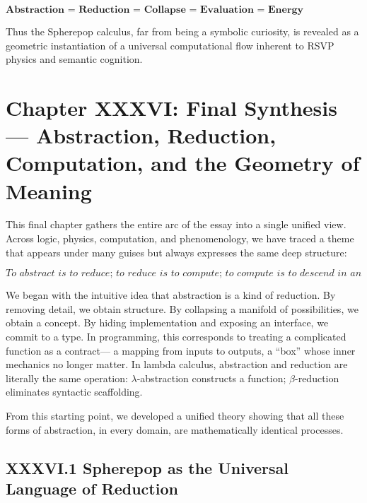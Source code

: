 \documentclass[12pt,letterpaper]{article}
\begin{document}
\[
\boxed{
\textbf{
Abstraction = Reduction = Collapse = Evaluation = 
Energy Minimization = Semantic Convergence.}}
\]

Thus the Spherepop calculus, far from being a symbolic curiosity,
is revealed as a geometric instantiation of a universal computational flow
inherent to RSVP physics and semantic cognition.

\newpage

\section{Chapter XXXVI: Final Synthesis —  
Abstraction, Reduction, Computation, and the Geometry of Meaning}

This final chapter gathers the entire arc of the essay into a single unified view.  
Across logic, physics, computation, and phenomenology, we have traced a theme that 
appears under many guises but always expresses the same deep structure:

\[
\boxed{
\textit{To abstract is to reduce;  
to reduce is to compute;  
to compute is to descend in an energy landscape;  
to descend is to align with meaning.}}
\]

We began with the intuitive idea that abstraction is a kind of reduction.  
By removing detail, we obtain structure.  
By collapsing a manifold of possibilities, we obtain a concept.  
By hiding implementation and exposing an interface, we commit to a type.  
In programming, this corresponds to treating a complicated function as a contract—
a mapping from inputs to outputs, a “box” whose inner mechanics no longer matter.
In lambda calculus, abstraction and reduction are literally the same operation:
$\lambda$-abstraction constructs a function; $\beta$-reduction eliminates syntactic scaffolding.

From this starting point, we developed a unified theory showing that all these forms of
abstraction, in every domain, are mathematically identical processes.

\subsection{XXXVI.1 Spherepop as the Universal Language of Reduction}
\end{document}
